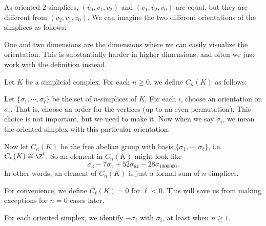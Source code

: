 \documentclass[a4paper]{article}
\begin{document}
\begin{eg}
  As oriented $2$-simplices, $(v_0, v_1, v_2)$ and $(v_1, v_2, v_0)$ are equal, but they are different from $(v_2, v_1, v_0)$. We can imagine the two different orientations of the simplices as follows:
  \begin{center}
  \end{center}
\end{eg}
One and two dimensions are the dimensions where we can easily visualize the orientation. This is substantially harder in higher dimensions, and often we just work with the definition instead.

\begin{defi}
  Let $K$ be a simplicial complex. For each $n \geq 0$, we define $C_n(K)$ as follows:

  Let $\{\sigma_1, \cdots, \sigma_\ell\}$ be the set of $n$-simplices of $K$. For each $i$, choose an orientation on $\sigma_i$. That is, choose an order for the vertices (up to an even permutation). This choice is not important, but we need to make it. Now when we say $\sigma_i$, we mean the oriented simplex with this particular orientation.

  Now let $C_n(K)$ be the free abelian group with basis $\{\sigma_1, \cdots, \sigma_\ell\}$, i.e.\ $C_n(K) \cong \Z^\ell$. So an element in $C_n(K)$ might look like
  \[
    \sigma_3 - 7 \sigma_1 + 52 \sigma_{64} - 28 \sigma_{1000000}.
  \]
  In other words, an element of $C_n(K)$ is just a formal sum of $n$-simplices.

  For convenience, we define $C_{\ell}(K) = 0$ for $\ell < 0$. This will save us from making exceptions for $n = 0$ cases later.
\end{defi}
For each oriented simplex, we identify $-\sigma_i$ with $\bar{\sigma}_i$, at least when $n \geq 1$.
\end{document}
